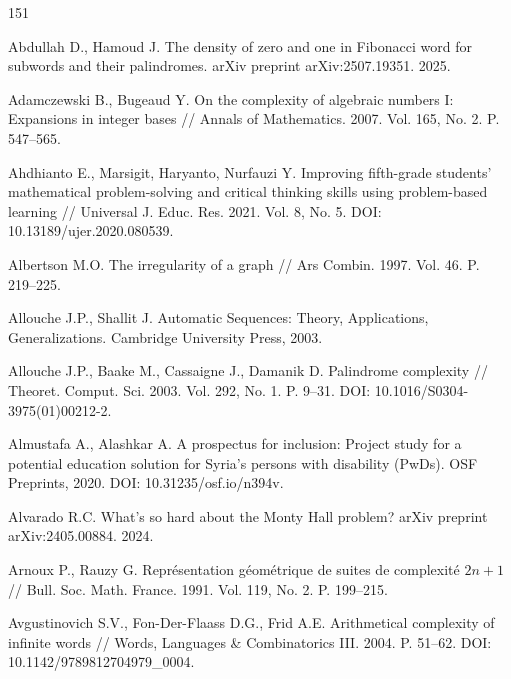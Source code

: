 \documentclass[a4paper,14pt]{extreport}
\theoremstyle{plain}
\theoremstyle{definition}
\theoremstyle{remark}
\begin{document}
	\begin{thebibliography}{151}
		
		Abdullah D., Hamoud J. The density of zero and one in Fibonacci word for subwords and their palindromes. arXiv preprint arXiv:2507.19351. 2025.
		
		
		
		Adamczewski B., Bugeaud Y. On the complexity of algebraic numbers I: Expansions in integer bases // Annals of Mathematics. 2007. Vol. 165, No. 2. P. 547--565.
		
		Ahdhianto E., Marsigit, Haryanto, Nurfauzi Y. Improving fifth-grade students' mathematical problem-solving and critical thinking skills using problem-based learning // Universal J. Educ. Res. 2021. Vol. 8, No. 5. DOI: 10.13189/ujer.2020.080539.
		
		Albertson M.O. The irregularity of a graph // Ars Combin. 1997. Vol. 46. P. 219--225.
		
		Allouche J.P., Shallit J. Automatic Sequences: Theory, Applications, Generalizations. Cambridge University Press, 2003.
		
		Allouche J.P., Baake M., Cassaigne J., Damanik D. Palindrome complexity // Theoret. Comput. Sci. 2003. Vol. 292, No. 1. P. 9--31. DOI: 10.1016/S0304-3975(01)00212-2.
		
		Almustafa A., Alashkar A. A prospectus for inclusion: Project study for a potential education solution for Syria's persons with disability (PwDs). OSF Preprints, 2020. DOI: 10.31235/osf.io/n394v.
		
		Alvarado R.C. What's so hard about the Monty Hall problem? arXiv preprint arXiv:2405.00884. 2024.
		
		Arnoux P., Rauzy G. Représentation géométrique de suites de complexité $2n+1$ // Bull. Soc. Math. France. 1991. Vol. 119, No. 2. P. 199--215.
		
		Avgustinovich S.V., Fon-Der-Flaass D.G., Frid A.E. Arithmetical complexity of infinite words // Words, Languages \& Combinatorics III. 2004. P. 51--62. DOI: 10.1142/9789812704979\_0004.
		

\end{thebibliography}
\end{document}
